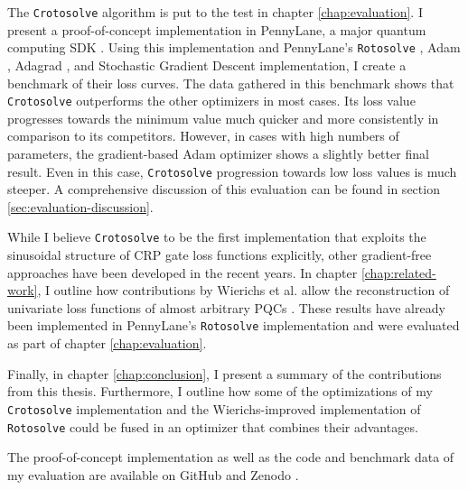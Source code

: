 The \texttt{Crotosolve} algorithm is put to the test in chapter
\ref{chap:evaluation}.
I present a proof-of-concept implementation in PennyLane, a major quantum
computing SDK \cite{bergholm_pennylane_2022,unitary_fund_team_results_2022}.
Using this implementation and PennyLane's
\texttt{Rotosolve} \cite{ostaszewski_structure_2021},
Adam \cite{kingma_adam_2017},
Adagrad \cite{duchi_adaptive_2011}, and
Stochastic Gradient Descent implementation, I create a benchmark of their loss
curves.
The data gathered in this benchmark shows that \texttt{Crotosolve} outperforms
the other optimizers in most cases.
Its loss value progresses towards the minimum value much quicker and more
consistently in comparison to its competitors.
However, in cases with high numbers of parameters, the gradient-based Adam
optimizer shows a slightly better final result.
Even in this case, \texttt{Crotosolve} progression towards low loss values is
much steeper. 
A comprehensive discussion of this evaluation can be found in section
\ref{sec:evaluation-discussion}.

While I believe \texttt{Crotosolve} to be the first implementation that exploits
the sinusoidal structure of CRP gate loss functions explicitly, other
gradient-free approaches have been developed in the recent years.
In chapter \ref{chap:related-work}, I outline how contributions by
Wierichs et al. allow the reconstruction of univariate loss functions of almost
arbitrary PQCs \cite{wierichs_general_2022}.
These results have already been implemented in PennyLane's \texttt{Rotosolve}
implementation and were evaluated as part of chapter \ref{chap:evaluation}.

Finally, in chapter \ref{chap:conclusion}, I present a summary of the
contributions from this thesis.
Furthermore, I outline how some of the optimizations of my \texttt{Crotosolve}
implementation and the Wierichs-improved implementation of \texttt{Rotosolve}
could be fused in an optimizer that combines their advantages.

The proof-of-concept implementation as well as the code and benchmark data of my
evaluation are available on GitHub and Zenodo
\cite{schweikart_schweikartcrotosolve_2023}.
